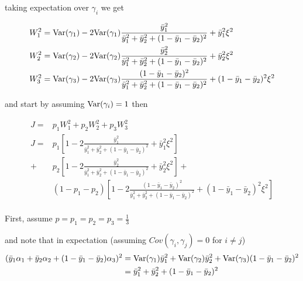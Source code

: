 taking expectation over $\gamma_i$ we get

\begin{align*}
		  &W_1^2=  \mathrm{Var}(\gamma_1) - 2 \mathrm{Var}(\gamma_1) \frac{\bar{y}_1^2}{\bar{y}_1^2 + \bar{y}_2^2 + (1 - \bar{y}_1 - \bar{y}_2 )^2} + \bar{y}_1^2 \xi^2 \\
		  &W_2^2=  \mathrm{Var}(\gamma_2) - 2 \mathrm{Var}(\gamma_2) \frac{\bar{y}_2^2}{\bar{y}_1^2 + \bar{y}_2^2 + (1 - \bar{y}_1 - \bar{y}_2 )^2} + \bar{y}_2^2 \xi^2 \\
		  &W_3^2=  \mathrm{Var}(\gamma_3) - 2 \mathrm{Var}(\gamma_3) \frac{(1 - \bar{y}_1 - \bar{y}_2)^2}{\bar{y}_1^2 + \bar{y}_2^2 + (1 - \bar{y}_1 - \bar{y}_2 )^2} + (1 - \bar{y}_1 - \bar{y}_2)^2 \xi^2 \\
\end{align*}

and start by assuming $\mathrm{Var}(\gamma_i) = 1$ then

\begin{align*}
	J = &p_1 W_1^2 + p_2 W_2^2 + p_3 W_3^2 \\
	J = &p_1[1 - 2 \frac{\bar{y}_1^2}{\bar{y}_1^2 + \bar{y}_2^2 + (1 - \bar{y}_1 - \bar{y}_2 )^2}+ \bar{y}_1^2 \xi^2] \\
	+ &p_2 [1 - 2 \frac{\bar{y}_2^2}{\bar{y}_1^2 + \bar{y}_2^2 + (1 - \bar{y}_1 - \bar{y}_2 )^2}+ \bar{y}_2^2 \xi^2 ] + \\
	  &(1-p_1 - p_2) [1 -2 \frac{(1-\bar{y}_1 - \bar{y}_2)^2}{\bar{y}_1^2 + \bar{y}_2^2 + (1 - \bar{y}_1 - \bar{y}_2 )^2} + (1-\bar{y}_1 - \bar{y}_2)^2 \xi^2] \\
\end{align*}

First, assume $p = p_1 = p_2 = p_3 = \frac{1}{3}$
            
and note that in expectation (assuming $Cov(\gamma_i, \gamma_j) = 0$ for $i \neq j$)
\begin{align*}
	(\bar{y}_1 \alpha_1 + \bar{y}_2 \alpha_2 + (1 - \bar{y}_1 - \bar{y}_2) \alpha_3 )^2 &= \mathrm{Var}(\gamma_1) \bar{y}_1^2 + \mathrm{Var}(\gamma_2) \bar{y}_2^2 + \mathrm{Var}(\gamma_3) (1 - \bar{y}_1 - \bar{y}_2)^2 \\
																					 &=  \bar{y}_1^2 +  \bar{y}_2^2 +  (1 - \bar{y}_1 - \bar{y}_2)^2 \\
\end{align*}

